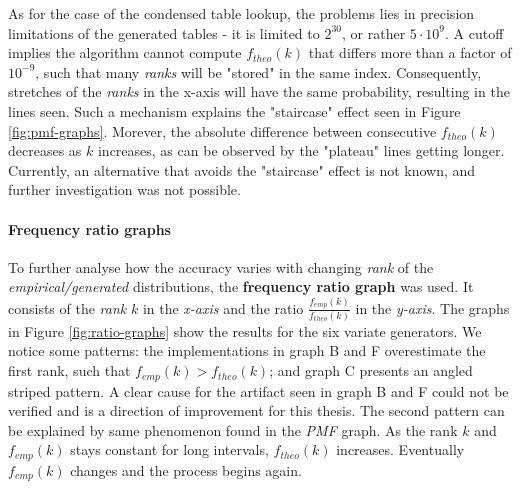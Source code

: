 As for the case of the condensed table lookup, the problems lies in precision limitations of the generated tables - it is limited to $2^{30}$, or rather $5 \cdot 10^9$. A cutoff implies the algorithm
 cannot compute $f_{theo}(k)$ that differs more than a factor of $10^{-9}$, such that many \textit{ranks} will be "stored" in the same index.  
Consequently, stretches of the \textit{ranks} in the x-axis will have the same probability, resulting in the lines seen. Such a mechanism explains
the "staircase" effect seen in Figure \ref{fig:pmf-graphs}. Morever, the absolute difference between consecutive $f_{theo}(k)$ decreases as $k$ increases, as can be observed by the "plateau" lines getting
longer. Currently, an alternative that avoids the "staircase" effect is not known, and further investigation was not possible.

\paragraph{Frequency ratio graphs} 
To further analyse how the accuracy varies with changing \textit{rank} of the \textit{empirical/generated} distributions, the \textbf{frequency ratio graph} was used. 
It consists of the \textit{rank} $k$ in the \textit{x-axis} and the ratio $\frac{f_{emp}(k)}{f_{theo}(k)}$ in the \textit{y-axis}. The graphs in Figure \ref{fig:ratio-graphs} show the 
results for the six variate generators. We notice some patterns: the implementations in graph B and F overestimate the first rank, such that $f_{emp}(k) > f_{theo}(k)$; and
graph C presents an angled striped pattern. A clear cause for the artifact seen in graph B and F could not be verified and is a direction of improvement for this thesis. 
The second pattern can be explained by same phenomenon found in the \textit{PMF} graph. As the rank $k$ and $f_{emp}(k)$ stays constant 
for long intervals, $f_{theo}(k)$ increases. Eventually $f_{emp}(k)$ changes and the process begins again.

